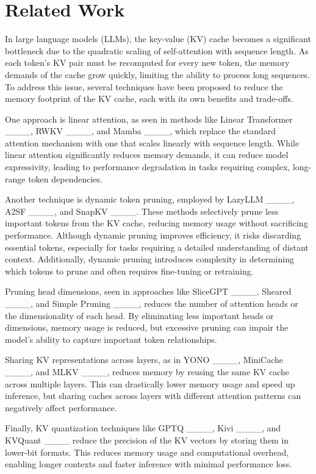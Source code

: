 \section{Related Work}
In large language models (LLMs), the key-value (KV) cache becomes a significant bottleneck due to the quadratic scaling of self-attention with sequence length. As each token's KV pair must be recomputed for every new token, the memory demands of the cache grow quickly, limiting the ability to process long sequences. To address this issue, several techniques have been proposed to reduce the memory footprint of the KV cache, each with its own benefits and trade-offs.

One approach is linear attention, as seen in methods like Linear Transformer ____, RWKV ____, and Mamba ____, which replace the standard attention mechanism with one that scales linearly with sequence length. While linear attention significantly reduces memory demands, it can reduce model expressivity, leading to performance degradation in tasks requiring complex, long-range token dependencies.

Another technique is dynamic token pruning, employed by LazyLLM ____, A2SF ____, and SnapKV ____. These methods selectively prune less important tokens from the KV cache, reducing memory usage without sacrificing performance. Although dynamic pruning improves efficiency, it risks discarding essential tokens, especially for tasks requiring a detailed understanding of distant context. Additionally, dynamic pruning introduces complexity in determining which tokens to prune and often requires fine-tuning or retraining.

Pruning head dimensions, seen in approaches like SliceGPT ____, Sheared ____, and Simple Pruning ____, reduces the number of attention heads or the dimensionality of each head. By eliminating less important heads or dimensions, memory usage is reduced, but excessive pruning can impair the model’s ability to capture important token relationships. 

Sharing KV representations across layers, as in YONO ____, MiniCache ____, and MLKV ____, reduces memory by reusing the same KV cache across multiple layers. This can drastically lower memory usage and speed up inference, but sharing caches across layers with different attention patterns can negatively affect performance.

Finally, KV quantization techniques like GPTQ ____, Kivi ____, and KVQuant ____ reduce the precision of the KV vectors by storing them in lower-bit formats. This reduces memory usage and computational overhead, enabling longer contexts and faster inference with minimal performance loss. 

\newpage